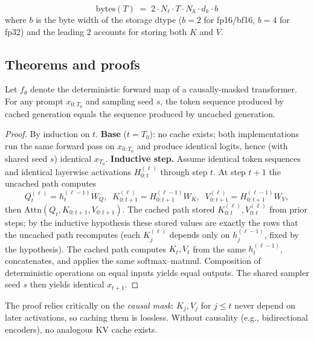 \begin{proposition}
\[ \boxed{\;\mathrm{bytes}(T) \;=\; 2 \cdot N_\ell \cdot T \cdot N_h \cdot d_k \cdot b\;} \]
where $b$ is the byte width of the storage dtype ($b=2$ for fp16/bf16, $b=4$ for fp32) and the leading $2$ accounts for storing both $K$ and $V$.
\end{proposition}

\subsection*{Theorems and proofs}

\begin{theorem}\label{thm:equiv}
Let $f_\theta$ denote the deterministic forward map of a causally-masked transformer. For any prompt $x_{0:T_0}$ and sampling seed $s$, the token sequence produced by cached generation equals the sequence produced by uncached generation.
\end{theorem}

\begin{proof}
By induction on $t$. \textbf{Base} ($t = T_0$): no cache exists; both implementations run the same forward pass on $x_{0:T_0}$ and produce identical logits, hence (with shared seed $s$) identical $x_{T_0}$. \textbf{Inductive step.} Assume identical token sequences and identical layerwise activations $H^{(\ell)}_{0:t}$ through step $t$. At step $t+1$ the uncached path computes
\[ Q_t^{(\ell)} = h_t^{(\ell-1)} W_Q, \;\; K_{0:t+1}^{(\ell)} = H^{(\ell-1)}_{0:t+1} W_K, \;\; V_{0:t+1}^{(\ell)} = H^{(\ell-1)}_{0:t+1} W_V, \]
then $\mathrm{Attn}(Q_t, K_{0:t+1}, V_{0:t+1})$. The cached path stored $K_{0:t}^{(\ell)}, V_{0:t}^{(\ell)}$ from prior steps; by the inductive hypothesis these stored values are exactly the rows that the uncached path recomputes (each $K_j^{(\ell)}$ depends only on $h_j^{(\ell-1)}$, fixed by the hypothesis). The cached path computes $K_t, V_t$ from the same $h_t^{(\ell-1)}$, concatenates, and applies the same softmax--matmul. Composition of deterministic operations on equal inputs yields equal outputs. The shared sampler seed $s$ then yields identical $x_{t+1}$.
\end{proof}

\begin{remark}
The proof relies critically on the \emph{causal mask}: $K_j, V_j$ for $j \leq t$ never depend on later activations, so caching them is lossless. Without causality (e.g., bidirectional encoders), no analogous KV cache exists.
\end{remark}

